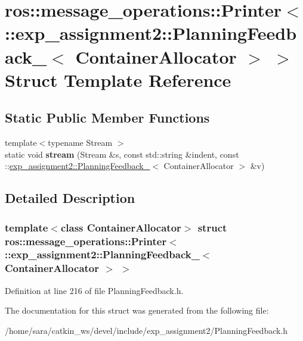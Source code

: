 \hypertarget{structros_1_1message__operations_1_1Printer_3_01_1_1exp__assignment2_1_1PlanningFeedback___3_01ContainerAllocator_01_4_01_4}{}\section{ros\+:\+:message\+\_\+operations\+:\+:Printer$<$ \+:\+:exp\+\_\+assignment2\+:\+:Planning\+Feedback\+\_\+$<$ Container\+Allocator $>$ $>$ Struct Template Reference}
\label{structros_1_1message__operations_1_1Printer_3_01_1_1exp__assignment2_1_1PlanningFeedback___3_01ContainerAllocator_01_4_01_4}
\subsection*{Static Public Member Functions}
\begin{DoxyCompactItemize}
\item 
\mbox{\label{structros_1_1message__operations_1_1Printer_3_01_1_1exp__assignment2_1_1PlanningFeedback___3_01ContainerAllocator_01_4_01_4_ad03033c2ea286509b4824a6552f1a58d}} 
{\footnotesize template$<$typename Stream $>$ }\\static void {\bfseries stream} (Stream \&s, const std\+::string \&indent, const \+::\hyperlink{structexp__assignment2_1_1PlanningFeedback__}{exp\+\_\+assignment2\+::\+Planning\+Feedback\+\_\+}$<$ Container\+Allocator $>$ \&v)
\end{DoxyCompactItemize}


\subsection{Detailed Description}
\subsubsection*{template$<$class Container\+Allocator$>$\newline
struct ros\+::message\+\_\+operations\+::\+Printer$<$ \+::exp\+\_\+assignment2\+::\+Planning\+Feedback\+\_\+$<$ Container\+Allocator $>$ $>$}



Definition at line 216 of file Planning\+Feedback.\+h.



The documentation for this struct was generated from the following file\+:\begin{DoxyCompactItemize}
\item 
/home/sara/catkin\+\_\+ws/devel/include/exp\+\_\+assignment2/Planning\+Feedback.\+h\end{DoxyCompactItemize}
